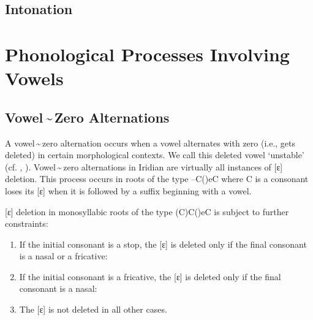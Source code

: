 \subsection{Intonation}

\section{Phonological Processes Involving Vowels}

\subsection{Vowel\,\sim\,Zero Alternations}

A vowel\,\sim\,zero alternation occurs when a vowel alternates with zero (i.e.,
gets deleted) in certain morphological contexts. We call this deleted vowel
`unstable' (cf. \cite{siptar2000}, \cite{gussmann2007}). Vowel\,\sim\,zero
alternations in Iridian are virtually all instances of [ɛ] deletion. This
process occurs in roots of the type --C()eC where C is a consonant loses
its [ɛ] when it is followed by a suffix beginning with a vowel.

\ex
{}
\xe

[ɛ] deletion in monosyllabic roots of the type (C)C()eC is subject to
further constraints:

\begin{enumerate}
	\item If the initial consonant is a stop, the [ɛ] is deleted only if the final consonant is a nasal or a fricative:\\

	\item If the initial consonant is a fricative, the [ɛ] is deleted only if the final consonant is a nasal:\\

	\item The [ɛ] is not deleted in all other cases.
\end{enumerate}

